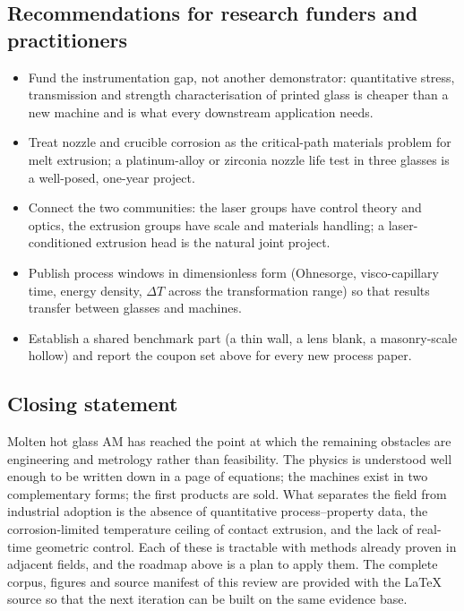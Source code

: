 \subsection{Recommendations for research funders and practitioners}
\begin{itemize}[leftmargin=*,itemsep=1pt]
  \item Fund the instrumentation gap, not another demonstrator: quantitative stress, transmission and strength characterisation of printed glass is cheaper than a new machine and is what every downstream application needs.
  \item Treat nozzle and crucible corrosion as the critical-path materials problem for melt extrusion; a platinum-alloy or zirconia nozzle life test in three glasses is a well-posed, one-year project.
  \item Connect the two communities: the laser groups have control theory and optics, the extrusion groups have scale and materials handling; a laser-conditioned extrusion head is the natural joint project.
  \item Publish process windows in dimensionless form (Ohnesorge, visco-capillary time, energy density, \(\Delta T\) across the transformation range) so that results transfer between glasses and machines.
  \item Establish a shared benchmark part (a thin wall, a lens blank, a masonry-scale hollow) and report the coupon set above for every new process paper.
\end{itemize}

\subsection{Closing statement}
Molten hot glass AM has reached the point at which the remaining obstacles are engineering and metrology rather than feasibility. The physics is understood well enough to be written down in a page of equations; the machines exist in two complementary forms; the first products are sold. What separates the field from industrial adoption is the absence of quantitative process--property data, the corrosion-limited temperature ceiling of contact extrusion, and the lack of real-time geometric control. Each of these is tractable with methods already proven in adjacent fields, and the roadmap above is a plan to apply them. The complete corpus, figures and source manifest of this review are provided with the LaTeX source so that the next iteration can be built on the same evidence base.
